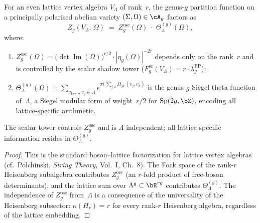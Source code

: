 \begin{proposition}
\label{prop:shadow-arithmetic-factorization}
\ClaimStatusProvedHere
{}
For an even lattice vertex algebra $V_\Lambda$ of rank~$r$,
the genus-$g$ partition function on a principally polarised
abelian variety $(\Sigma, \Omega) \in \cA_g$ factors as
\begin{equation}\label{eq:shadow-arithmetic-factorization}
 Z_g(V_\Lambda;\, \Omega)
 \;=\;
 Z_g^{\mathrm{osc}}(\Omega)
 \;\cdot\;
 \Theta_\Lambda^{(g)}(\Omega),
\end{equation}
where\textup{:}
\begin{enumerate}[label=\textup{(\roman*)}]
\item $Z_g^{\mathrm{osc}}(\Omega)
 = \bigl(\det \operatorname{Im}(\Omega)\bigr)^{r/2}
 \cdot |\eta_g(\Omega)|^{-2r}$
 depends only on the rank~$r$ and is controlled by
 the scalar shadow tower
 \textup{(}$F_g^{\mathrm{sc}}(V_\Lambda)
 = r \cdot \lambda_g^{\mathrm{FP}}$\textup{)};
\item $\Theta_\Lambda^{(g)}(\Omega)
 = \sum_{v_1, \ldots, v_g \in \Lambda}
 e^{\pi i\, \sum_{j,k} \Omega_{jk}\, (v_j, v_k)}$
 is the genus-$g$ Siegel theta function of~$\Lambda$,
 a Siegel modular form of weight~$r/2$ for
 $\mathrm{Sp}(2g, \bZ)$, encoding all lattice-specific
 arithmetic.
\end{enumerate}
The scalar tower controls
$Z_g^{\mathrm{osc}}$ and is $\Lambda$-independent;
all lattice-specific information resides in
$\Theta_\Lambda^{(g)}$.
\end{proposition}

\begin{proof}
This is the standard boson--lattice factorization
for lattice vertex algebras
\textup{(}cf.~Polchinski, \emph{String Theory},
Vol.~I, Ch.~$8$\textup{)}.
The Fock space of the rank-$r$ Heisenberg
subalgebra contributes $Z_g^{\mathrm{osc}}$
(an $r$-fold product of free-boson determinants),
and the lattice sum over $\Lambda^g \subset \bR^{rg}$
contributes $\Theta_\Lambda^{(g)}$.
The independence of $Z_g^{\mathrm{osc}}$ from~$\Lambda$
is a consequence of the universality of the Heisenberg
subsector: $\kappa(H_r) = r$ for every rank-$r$
Heisenberg algebra, regardless of the lattice embedding.
\end{proof}


